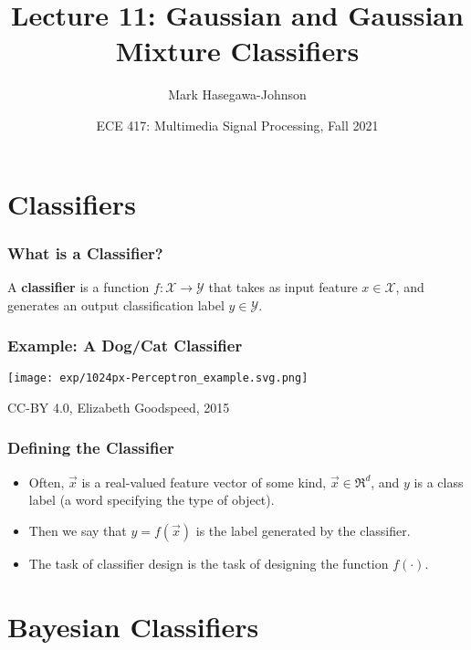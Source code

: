 \documentclass{beamer}
\title{Lecture 11: Gaussian and Gaussian  Mixture Classifiers}
\author{Mark Hasegawa-Johnson}
\date{ECE 417: Multimedia Signal Processing, Fall 2021}
\begin{document}
\begin{frame}
  \maketitle
\end{frame}

\begin{frame}
  \tableofcontents
\end{frame}

\section[Classifiers]{Classifiers}
\setcounter{subsection}{1}

\begin{frame}
  \frametitle{What is a Classifier?}

  A {\bf classifier} is a function $f:{\mathcal X}\rightarrow{\mathcal
    Y}$ that takes as input feature $x\in{\mathcal X}$, and generates
  an output classification label $y\in{\mathcal Y}$.

\end{frame}

\begin{frame}
  \frametitle{Example: A Dog/Cat Classifier}

  \centerline{\texttt{[image: exp/1024px-Perceptron\_example.svg.png]}}
  {\tiny CC-BY 4.0, Elizabeth Goodspeed, 2015}
\end{frame}

\begin{frame}
  \frametitle{Defining the Classifier}

  \begin{itemize}
  \item
    Often, $\vec{x}$ is a real-valued feature vector of some kind,
    $\vec{x}\in\Re^d$, and $y$ is a class label (a word specifying the type of
    object).
  \item
    Then we  say that $y=f(\vec{x})$ is the label generated by the classifier.
  \item
    The task of classifier design is the task of designing the function $f(\cdot)$.
  \end{itemize}
\end{frame}

\section[Bayesian]{Bayesian Classifiers}
\setcounter{subsection}{1}
\end{document}
